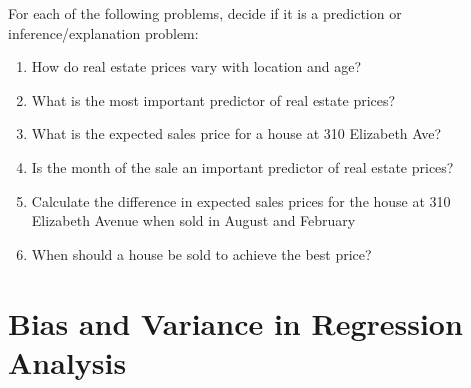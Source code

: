 \begin{exerciseboxpaper}
For each of the following problems, decide if it is a prediction or inference/explanation problem:
\begin{enumerate}
   \item How do real estate prices vary with location and age?
   \item What is the most important predictor of real estate prices?
   \item What is the expected sales price for a house at 310 Elizabeth Ave?
   \item Is the month of the sale an important predictor of real estate prices?
   \item Calculate the difference in expected sales prices for the house at 310 Elizabeth Avenue when sold in August and February
   \item When should a house be sold to achieve the best price?
\end{enumerate}
\end{exerciseboxpaper}

\section{Bias and Variance in Regression Analysis}

